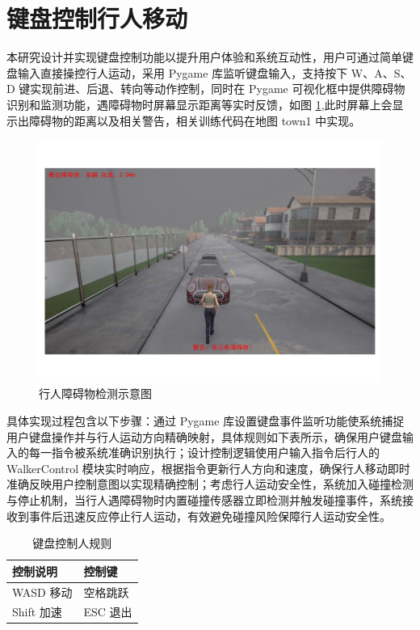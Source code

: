 \section{键盘控制行人移动}
本研究设计并实现键盘控制功能以提升用户体验和系统互动性，用户可通过简单键盘输入直接操控行人运动，采用 Pygame 库监听键盘输入，支持按下 W、A、S、D 键实现前进、后退、转向等动作控制，同时在 Pygame 可视化框中提供障碍物识别和监测功能，遇障碍物时屏幕显示距离等实时反馈，如图 \ref{fig:collision_detection},此时屏幕上会显示出障碍物的距离以及相关警告，相关训练代码在地图 town1 中实现。

\begin{figure}[H]
    \centering
    \includegraphics[width=1\textwidth]{images/collision_detection.pdf}
    \caption{行人障碍物检测示意图}
    \label{fig:collision_detection}
\end{figure}

具体实现过程包含以下步骤：通过 Pygame 库设置键盘事件监听功能使系统捕捉用户键盘操作并与行人运动方向精确映射，具体规则如下表所示，确保用户键盘输入的每一指令被系统准确识别执行；设计控制逻辑使用户输入指令后行人的 WalkerControl 模块实时响应，根据指令更新行人方向和速度，确保行人移动即时准确反映用户控制意图以实现精确控制；考虑行人运动安全性，系统加入碰撞检测与停止机制，当行人遇障碍物时内置碰撞传感器立即检测并触发碰撞事件，系统接收到事件后迅速反应停止行人运动，有效避免碰撞风险保障行人运动安全性。

\begin{table}[H]
    \centering
    \renewcommand{\arraystretch}{1.3}
    \begin{tabular}{
      >{\centering\arraybackslash}p{6.5cm}
      >{\centering\arraybackslash}p{4cm}
    }
    \toprule
    \textbf{控制说明} & \textbf{控制键} \\
    \midrule
    WASD 移动 & 空格跳跃 \\
    Shift 加速 & ESC 退出 \\
    \bottomrule
    \end{tabular}
    \caption{键盘控制人规则}
    \label{tab:keyboard-control}
\end{table}

